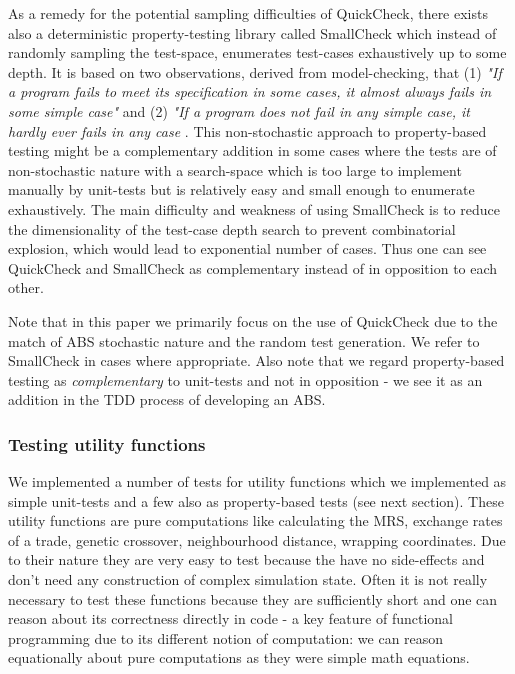 As a remedy for the potential sampling difficulties of QuickCheck, there exists also a deterministic property-testing library called SmallCheck \cite{runciman_smallcheck_2008} which instead of randomly sampling the test-space, enumerates test-cases exhaustively up to some depth. It is based on two observations, derived from model-checking, that (1) \textit{"If a program fails to meet its specification in some cases, it almost always fails in some simple case"} and (2) \textit{"If a program does not fail in any simple case, it hardly ever fails in any case} \cite{runciman_smallcheck_2008}. This non-stochastic approach to property-based testing might be a complementary addition in some cases where the tests are of non-stochastic nature with a search-space which is too large to implement manually by unit-tests but is relatively easy and small enough to enumerate exhaustively. The main difficulty and weakness of using SmallCheck is to reduce the dimensionality of the test-case depth search to prevent combinatorial explosion, which would lead to exponential number of cases. Thus one can see QuickCheck and SmallCheck as complementary instead of in opposition to each other.

Note that in this paper we primarily focus on the use of QuickCheck due to the match of ABS stochastic nature and the random test generation. We refer to SmallCheck in cases where appropriate. Also note that we regard property-based testing as \textit{complementary} to unit-tests and not in opposition - we see it as an addition in the TDD process of developing an ABS.

\subsubsection{Testing utility functions}
We implemented a number of tests for utility functions which we implemented as simple unit-tests and a few also as property-based tests (see next section). These utility functions are pure computations like calculating the MRS, exchange rates of a trade, genetic crossover, neighbourhood distance, wrapping coordinates. Due to their nature they are very easy to test because the have no side-effects and don't need any construction of complex simulation state. Often it is not really necessary to test these functions because they are sufficiently short and one can reason about its correctness directly in code - a key feature of functional programming due to its different notion of computation: we can reason equationally about pure computations as they were simple math equations.

